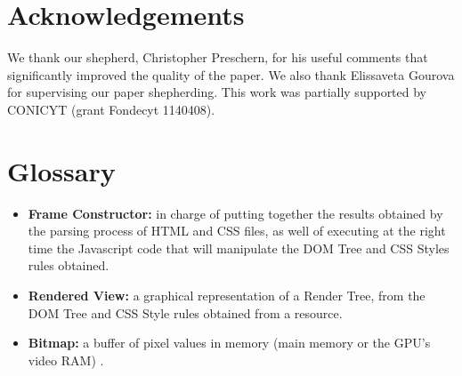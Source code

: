\documentclass[prodmode,acmtecs]{acmsmall}
\begin{document}
\section{Acknowledgements}
We thank our shepherd, Christopher Preschern, for his useful comments that significantly improved the quality of the paper. We also thank Elissaveta Gourova for supervising our paper shepherding. 
This work was partially supported by CONICYT (grant Fondecyt 1140408).

\section{Glossary}
\begin{itemize}\leftskip0.2em
  \item \textbf{Frame Constructor:} in charge of putting together the results obtained by the parsing process of HTML and CSS files, as well of executing at the right time the Javascript code that will manipulate the DOM Tree and CSS Styles rules obtained. 
  \item \textbf{Rendered View:} a graphical representation of a Render Tree, from the DOM Tree and CSS Style rules obtained from a resource.
  \item \textbf{Bitmap:} a buffer of pixel values in memory (main memory or the GPU’s video RAM) \cite{gpuchrome}.
\end{itemize}


  

\end{document}
